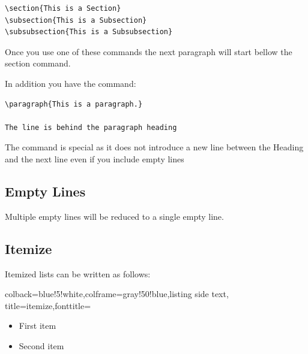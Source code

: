 \begin{verbatim}
\section{This is a Section}
\subsection{This is a Subsection}
\subsubsection{This is a Subsubsection}  
\end{verbatim}

Once you use one of these commands the next paragraph will start bellow
the section command.

In addition you have the command:

\begin{verbatim}
\paragraph{This is a paragraph.}

The line is behind the paragraph heading
\end{verbatim}

The command is special as it does not introduce a new line between the
Heading and the next line even if you include empty lines

\subsection{Empty Lines}\label{empty-lines}

Multiple empty lines will be reduced to a single empty line.

\subsection{Itemize}\label{itemize}


Itemized lists can be written as follows:


\begin{tcblisting}{colback=blue!5!white,colframe=gray!50!blue,listing side text,
  title=itemize,fonttitle=\bfseries}
\begin{itemize}
   \item First item
   \item Second item
\end{itemize}
\end{tcblisting} 


